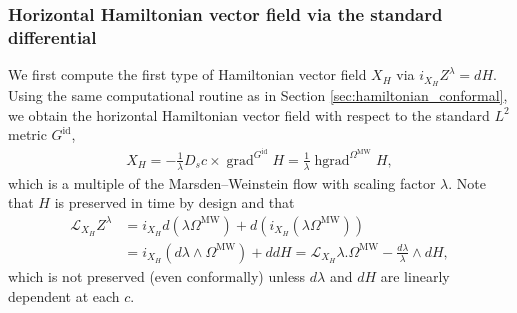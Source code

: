 \documentclass[12pt]{amsart}
\newcommand{\AuthorCOMMENT}[3]{\textcolor{#2}{{[\textbf{#1:} \textsl{#3}}]}}  %
\newcommand{\Sadashige}[1]{\AuthorCOMMENT{Sadashige}{violet}{#1}}
\theoremstyle{definition}
\newcommand{\R}{\mathbb R}
\newcommand{\id}{\mathrm{id}}
\newcommand{\Imm}{\mathrm{Imm}}
\newcommand{\OmMW}{\Omega^{\operatorname{MW}}}
\def\L{\mathcal{L}}
\def\J{\mathcal{J}}
\def\R{{\mathbb R}}
\let\on=\operatorname
\begin{document}
{%

\subsubsection*{Horizontal Hamiltonian vector field via the standard differential}
We first compute the first type of Hamiltonian vector field $X_H$ via $i_{X_H}Z^\lambda = dH$. Using the same computational routine as in Section \ref{sec:hamiltonian_conformal}, we obtain the horizontal Hamiltonian vector field with respect to the standard $L^2$ metric $G^\id$,
\begin{align}
    X_H = - \frac{1}{\lambda}D_s c \times \on{grad}^{G^{\id}} H = \frac{1}{\lambda} \on{hgrad}^{\Omega^{\on{MW}}}H,
\end{align}
which is a multiple of the Marsden--Weinstein flow with scaling factor $\lambda$.
Note that $H$ is preserved in time by design and that
\begin{align}
    \L_{X_H}Z^{\lambda}
    &= i_{X_H} d(\lambda \OmMW) + d( i_{X_H}(\lambda\OmMW))\\
    & = i_{X_H}(d\lambda\wedge \OmMW)+ ddH
    = \L_{X_H}\lambda.\OmMW - \frac{d\lambda}{\lambda}\wedge dH,
\end{align}
which is not preserved (even conformally) unless $d\lambda$ and $dH$ are linearly dependent at each $c$.}
\end{document}

